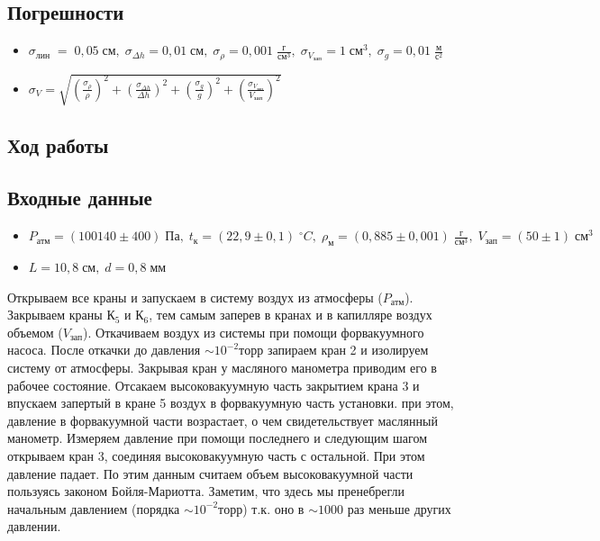 \documentclass[a4paper, 12pt]{article}
\begin{document}
\bigskip

\newpage

\begin{center}
	\subsection*{Погрешности}
\end{center}

\begin{itemize}
	\item $\sigma_{\text{лин}} \; = \; 0,05 \; \text{см}, \; \sigma_{\Delta h} = 0,01 \; \text{см}, \; \sigma_{\rho} = 0,001 \; \frac{\text{г}}{\text{см}^3}, \; \sigma_{V_{\text{зап}}} = 1 \; \text{см}^3, \; \sigma_g = 0,01 \; \frac{\text{м}}{\text{с}^2} $
	\item $\sigma_V = \sqrt{(\frac{\sigma_\rho}{\rho})^2 + (\frac{\sigma_{\Delta h}}{\Delta h})^2 + (\frac{\sigma_{g}}{g})^2 + (\frac{\sigma_{V_\text{зап}}}{V_\text{зап}})^2} $
\end{itemize}

\begin{center}
    \section*{Ход работы}
\end{center}


\subsection*{Входные данные}

\bigskip

\begin{itemize}
	\item $P_\text{атм} = (100140 \pm 400) \; \text{Па}, \; t_\text{к} = (22,9 \pm 0,1) \; ^\circ C, \; \rho_\text{м} = (0,885 \pm 0,001) \; \frac{\text{г}}{\text{см}^3}, \; V_\text{зап} = (50 \pm 1) \; \text{см}^3  $
	\item $L = 10,8 \; \text{см}, \; d = 0,8 \; \text{мм}$
\end{itemize}

Открываем все краны и запускаем в систему воздух из атмосферы ($P_{\text{атм}}$). Закрываем краны $К_5$ и $К_6$, тем самым заперев в кранах и в капилляре воздух объемом ($V_{\text{зап}}$). Откачиваем воздух из системы при помощи форвакуумного насоса. После откачки до давления $\sim 10^{-2} торр$ запираем кран 2 и изолируем систему от атмосферы. Закрывая кран у масляного манометра приводим его в рабочее состояние. Отсакаем высоковакуумную часть закрытием крана 3 и впускаем запертый в кране 5 воздух в форвакуумную часть установки. при этом, давление в форвакуумной части возрастает, о чем свидетельствует маслянный манометр. Измеряем давление при помощи последнего и следующим шагом открываем кран 3, соединяя высоковакуумную часть с остальной. При этом давление падает. По этим данным считаем объем высоковакуумной части пользуясь законом Бойля-Мариотта. Заметим, что здесь мы пренебрегли начальным давлением (порядка $\sim 10^{-2} торр$) т.к. оно в $\sim 1000$ раз меньше других давлении.
\end{document}
